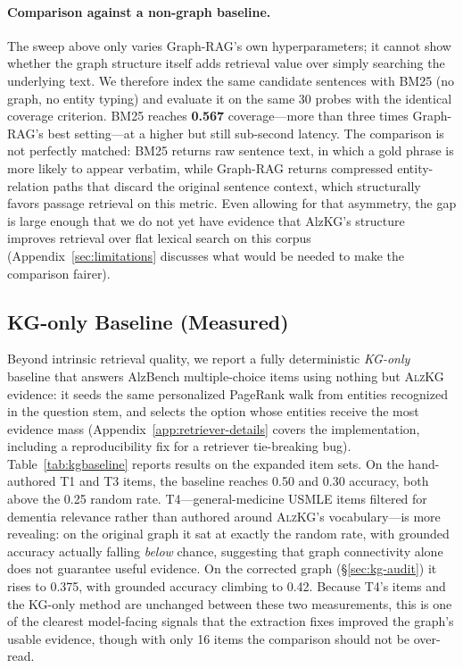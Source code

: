 \documentclass{article}
\begin{document}
\paragraph{Comparison against a non-graph baseline.} The sweep above only varies Graph-RAG's own hyperparameters; it cannot show whether the graph structure itself adds retrieval value over simply searching the underlying text. We therefore index the same candidate sentences with BM25 (no graph, no entity typing) and evaluate it on the same 30 probes with the identical coverage criterion. BM25 reaches \textbf{0.567} coverage---more than three times Graph-RAG's best setting---at a higher but still sub-second latency. The comparison is not perfectly matched: BM25 returns raw sentence text, in which a gold phrase is more likely to appear verbatim, while Graph-RAG returns compressed entity-relation paths that discard the original sentence context, which structurally favors passage retrieval on this metric. Even allowing for that asymmetry, the gap is large enough that we do not yet have evidence that AlzKG's structure improves retrieval over flat lexical search on this corpus (Appendix~\ref{sec:limitations} discusses what would be needed to make the comparison fairer).

\subsection{KG-only Baseline (Measured)}
\label{sec:kgbaseline-measured}
Beyond intrinsic retrieval quality, we report a fully deterministic \emph{KG-only} baseline that answers AlzBench multiple-choice items using nothing but \textsc{AlzKG} evidence: it seeds the same personalized PageRank walk from entities recognized in the question stem, and selects the option whose entities receive the most evidence mass (Appendix~\ref{app:retriever-details} covers the implementation, including a reproducibility fix for a retriever tie-breaking bug). Table~\ref{tab:kgbaseline} reports results on the expanded item sets. On the hand-authored T1 and T3 items, the baseline reaches 0.50 and 0.30 accuracy, both above the 0.25 random rate. T4---general-medicine USMLE items filtered for dementia relevance rather than authored around \textsc{AlzKG}'s vocabulary---is more revealing: on the original graph it sat at exactly the random rate, with grounded accuracy actually falling \emph{below} chance, suggesting that graph connectivity alone does not guarantee useful evidence. On the corrected graph (\S\ref{sec:kg-audit}) it rises to 0.375, with grounded accuracy climbing to 0.42. Because T4's items and the KG-only method are unchanged between these two measurements, this is one of the clearest model-facing signals that the extraction fixes improved the graph's usable evidence, though with only 16 items the comparison should not be over-read.
\end{document}
